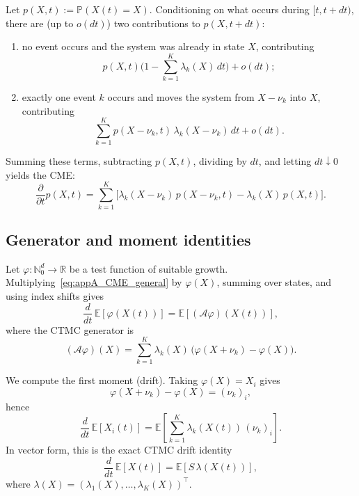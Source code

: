 \documentclass[pdflatex,sn-mathphys-ay]{sn-jnl}
\theoremstyle{thmstyleone}
\theoremstyle{definition}
\theoremstyle{remark}
\begin{document}
\begin{appendices}
Let \(p(X,t):=\mathbb P(X(t)=X)\). Conditioning on what occurs during \([t,t+dt)\), there are (up to \(o(dt)\)) two contributions to \(p(X,t+dt)\):
\begin{enumerate}[label=(\roman*)]
\item no event occurs and the system was already in state \(X\), contributing
\begin{equation}\label{eq:appA_CME_contrib1}
p(X,t)\Big(1-\sum_{k=1}^K\lambda_k(X)\,dt\Big)+o(dt);
\end{equation}
\item exactly one event \(k\) occurs and moves the system from \(X-\nu_k\) into \(X\), contributing
\begin{equation}\label{eq:appA_CME_contrib2}
\sum_{k=1}^K p(X-\nu_k,t)\,\lambda_k(X-\nu_k)\,dt+o(dt).
\end{equation}
\end{enumerate}
Summing these terms, subtracting \(p(X,t)\), dividing by \(dt\), and letting \(dt\downarrow 0\) yields the CME:
\begin{equation}\label{eq:appA_CME_general}
\frac{\partial}{\partial t}p(X,t)
=
\sum_{k=1}^K
\Big[
\lambda_k(X-\nu_k)\,p(X-\nu_k,t)
-
\lambda_k(X)\,p(X,t)
\Big].
\end{equation}

\subsection{Generator and moment identities}
\label{app:CME_moments}

Let \(\varphi:\mathbb N_0^d\to\mathbb R\) be a test function of suitable growth. Multiplying~\eqref{eq:appA_CME_general} by \(\varphi(X)\), summing over states, and using index shifts gives
\begin{equation}\label{eq:appA_generator_identity}
\frac{d}{dt}\,\mathbb E[\varphi(X(t))]
=
\mathbb E\!\left[(\mathcal A\varphi)(X(t))\right],
\end{equation}
where the CTMC generator is
\begin{equation}\label{eq:appA_CTMC_generator}
(\mathcal A\varphi)(X)
=
\sum_{k=1}^K \lambda_k(X)\,\big(\varphi(X+\nu_k)-\varphi(X)\big).
\end{equation}

We compute the first moment (drift).
Taking \(\varphi(X)=X_i\) gives
\[
\varphi(X+\nu_k)-\varphi(X)=(\nu_k)_i,
\]
hence
\begin{equation}\label{eq:appA_first_moment}
\frac{d}{dt}\,\mathbb E[X_i(t)]
=
\mathbb E\!\left[\sum_{k=1}^K \lambda_k(X(t))\,(\nu_k)_i\right].
\end{equation}
In vector form, this is the exact CTMC drift identity
\begin{equation}\label{eq:appA_first_moment_vector}
\frac{d}{dt}\,\mathbb E[X(t)]
=
\mathbb E\!\left[S\,\lambda(X(t))\right],
\end{equation}
where \(\lambda(X)=(\lambda_1(X),\dots,\lambda_K(X))^\top\).


\end{appendices}
\end{document}
